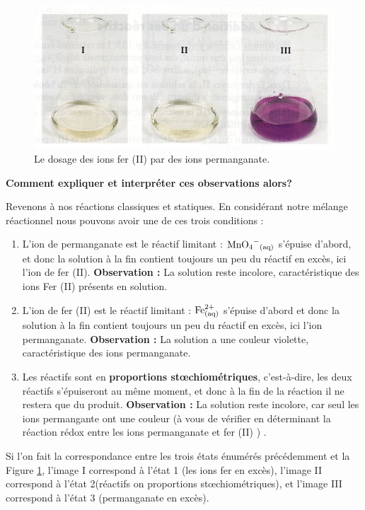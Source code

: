 \documentclass[11pt,a4paper]{article}
\begin{document}
\begin{figure}[h]
    \centering
    \includegraphics[width=0.8\linewidth]{imgs/c1/fer.jpg}
    \caption{Le dosage des ions fer (II) par des ions permanganate.}
    \label{fig:dosagefer}
\end{figure}


\textbf{Comment expliquer et interpréter ces observations alors?}  

Revenons à nos réactions classiques et statiques.  En considérant notre mélange réactionnel nous pouvons avoir une de ces trois conditions :

\begin{enumerate}
	\item L’ion de permanganate est le réactif limitant : $\ce{MnO4^{-}_{(aq)}}$ s’épuise d’abord, et donc la solution à la fin contient toujours un peu du réactif en excès, ici l’ion de fer (II). \textbf{Observation : } La solution reste incolore, caractéristique des ions Fer (II) présents en solution. 
    \item 	L’ion de fer (II) est le réactif limitant : $\ce{Fe^{2+}_{(aq)}}$ s’épuise d’abord et donc la solution à la fin contient toujours un peu du réactif en excès, ici l’ion permanganate. \textbf{Observation : } La solution a une couleur violette, caractéristique des ions permanganate. 
    \item Les réactifs sont en \textbf{proportions stœchiométriques}, c'est-à-dire, les deux réactifs s’épuiseront au même moment, et donc à la fin de la réaction il ne restera que du produit. \textbf{Observation : } La solution reste incolore, car seul les ions permangante ont une couleur (à vous de vérifier en déterminant la réaction rédox entre les ions permanganate et fer (II) ) . 
\end{enumerate}

Si l'on fait la correspondance entre les trois états énumérés précédemment et la Figure \ref{fig:dosagefer}, l'image I correspond à l'état 1 (les ions fer en excès), l'image II correspond à l'état 2(réactifs on proportions st\oe chiométriques), et l'image III correspond à l'état 3 (permanganate en excès). 
\end{document}
